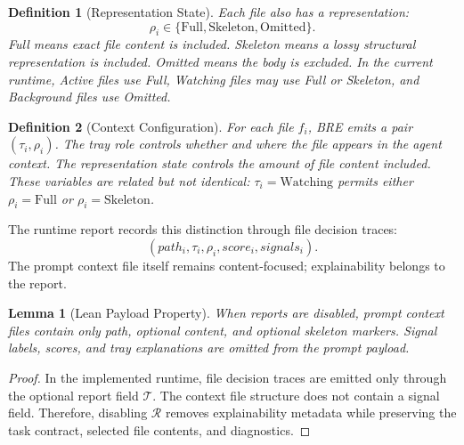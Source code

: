 \documentclass[11pt,onecolumn]{article}
\newtheorem{definition}{Definition}
\newtheorem{lemma}{Lemma}
\begin{document}
\begin{definition}[Representation State]
Each file also has a representation:
\begin{equation}
\rho_i \in \{\text{Full}, \text{Skeleton}, \text{Omitted}\}.
\end{equation}
Full means exact file content is included. Skeleton means a lossy structural representation is included. Omitted means the body is excluded. In the current runtime, Active files use Full, Watching files may use Full or Skeleton, and Background files use Omitted.
\end{definition}

\begin{definition}[Context Configuration]
For each file $f_i$, BRE emits a pair $(\tau_i,\rho_i)$. The tray role controls whether and where the file appears in the agent context. The representation state controls the amount of file content included. These variables are related but not identical: $\tau_i=\mathrm{Watching}$ permits either $\rho_i=\mathrm{Full}$ or $\rho_i=\mathrm{Skeleton}$.
\end{definition}

The runtime report records this distinction through file decision traces:
\begin{equation}
(path_i, \tau_i, \rho_i, score_i, signals_i).
\end{equation}
The prompt context file itself remains content-focused; explainability belongs to the report.

\begin{lemma}[Lean Payload Property]
When reports are disabled, prompt context files contain only path, optional content, and optional skeleton markers. Signal labels, scores, and tray explanations are omitted from the prompt payload.
\end{lemma}

\begin{proof}
In the implemented runtime, file decision traces are emitted only through the optional report field $\mathcal{T}$. The context file structure does not contain a signal field. Therefore, disabling $\mathcal{R}$ removes explainability metadata while preserving the task contract, selected file contents, and diagnostics.
\end{proof}
\end{document}
